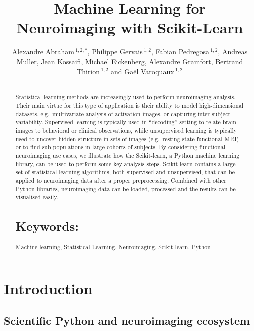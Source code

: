 \documentclass{frontiersSCNS} %
\def\firstAuthorLast{Alexandre Abraham {et~al}} %
\def\Authors{Alexandre Abraham\,$^{1,2,*}$, Philippe Gervais\,$^{1,2}$, Fabian
Pedregosa\,$^{1,2}$, Andreas Muller, Jean Kossaifi, Michael Eickenberg, Alexandre Gramfort, Bertrand
Thirion\,$^{1,2}$ and Ga\"el Varoquaux\,$^{1,2}$}
\begin{document}
\onecolumn
{}

\title[Machine Learning for Neuroimaging with Scikit-Learn]{Machine Learning for Neuroimaging with Scikit-Learn}
\author[\firstAuthorLast ]{\Authors}
\address{}
\correspondance{}
\editor{}

\maketitle
\begin{abstract}

\section{}
Statistical learning methods are increasingly used to perform
neuroimaging analysis. Their main virtue for this type of application
is their ability to model high-dimensional datasets, e.g.\ multivariate
analysis of activation images, or capturing inter-subject variability.
Supervised learning is typically used in “decoding” setting to relate
brain images to behavioral or clinical observations, while
unsupervised learning is typically used to uncover hidden structure in
sets of images (e.g.\ resting state functional MRI) or to find
sub-populations in large cohorts of subjects. By considering
functional neuroimaging use cases, we illustrate how the Scikit-learn,
a Python machine learning library, can be used to perform some key
analysis steps. Scikit-learn contains a large set of statistical
learning algorithms, both supervised and unsupervised, that can be applied
to neuroimaging data after a proper preprocessing. Combined with other
Python libraries, neuroimaging data can be loaded, processed and the results
can be visualised easily.



\tiny
\section{Keywords:} Machine learning, Statistical Learning, Neuroimaging, Scikit-learn, Python
\end{abstract}


\section{Introduction}


\subsection{Scientific Python and neuroimaging ecosystem}
\end{document}
